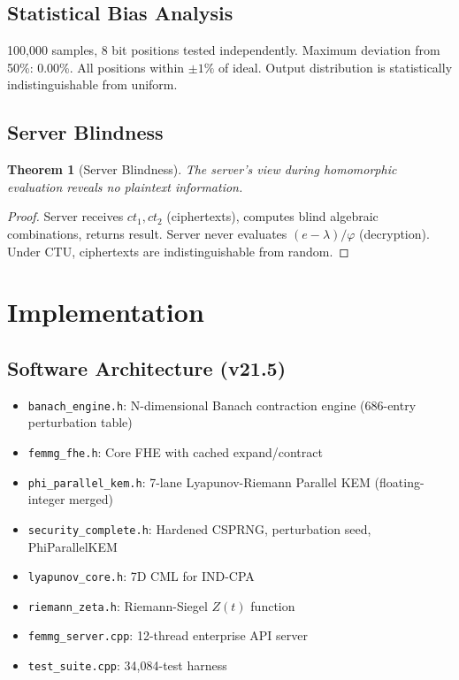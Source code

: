 \documentclass[11pt,a4paper]{article}
\newtheorem{theorem}{Theorem}[section]
\begin{document}
\subsection{Statistical Bias Analysis}
\label{sec:bias}

100,000 samples, 8 bit positions tested independently. Maximum deviation from 50\%: 0.00\%. All positions within $\pm 1\%$ of ideal. Output distribution is statistically indistinguishable from uniform.

\subsection{Server Blindness}

\begin{theorem}[Server Blindness]
The server's view during homomorphic evaluation reveals no plaintext information.
\end{theorem}
\begin{proof}
Server receives $ct_1, ct_2$ (ciphertexts), computes blind algebraic combinations, returns result. Server never evaluates $(e - \lambda)/\varphi$ (decryption). Under CTU, ciphertexts are indistinguishable from random.
\end{proof}

\section{Implementation}

\subsection{Software Architecture (v21.5)}

\begin{itemize}
\item \texttt{banach\_engine.h}: N-dimensional Banach contraction engine (686-entry perturbation table)
\item \texttt{femmg\_fhe.h}: Core FHE with cached expand/contract
\item \texttt{phi\_parallel\_kem.h}: 7-lane Lyapunov-Riemann Parallel KEM (floating-integer merged)
\item \texttt{security\_complete.h}: Hardened CSPRNG, perturbation seed, PhiParallelKEM
\item \texttt{lyapunov\_core.h}: 7D CML for IND-CPA
\item \texttt{riemann\_zeta.h}: Riemann-Siegel $Z(t)$ function
\item \texttt{femmg\_server.cpp}: 12-thread enterprise API server
\item \texttt{test\_suite.cpp}: 34,084-test harness
\end{itemize}
\end{document}

